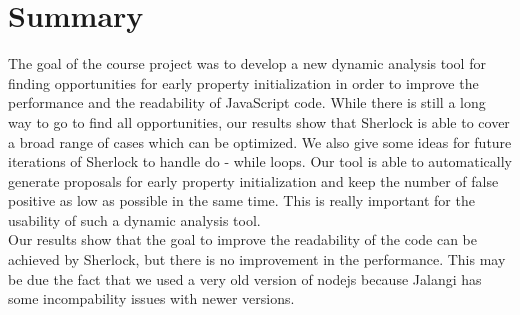 \section{Summary}
The goal of the course project was to develop a new dynamic analysis tool for finding opportunities 
for early property initialization in order to improve the performance and the readability of 
JavaScript code. While there is still a long way to go to find all opportunities, our results 
show that Sherlock is able to cover a broad range of cases which can be optimized. We also give 
some ideas for future iterations of Sherlock to handle do - while loops. Our tool is able to 
automatically generate proposals for early property initialization and keep the number of false 
positive as low as possible in the same time. This is really important for the usability of such a 
dynamic analysis tool.\\ Our results show that the goal to improve the readability of the code can 
be achieved by Sherlock, but there is no improvement in the performance. This may be due the fact
 that we used a very old version of nodejs because Jalangi has some incompability issues with newer versions.  


\label{sec:summary}